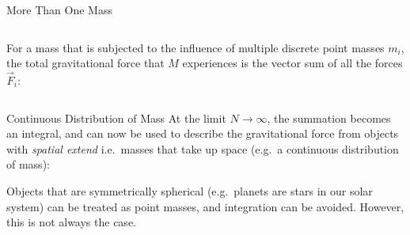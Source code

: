 \documentclass[12pt,compress,aspectratio=169]{beamer}
\begin{document}
\begin{frame}{More Than One Mass}
  \begin{columns}

    For a mass that is subjected to the influence of multiple discrete point
    masses $m_i$, the total gravitational force that $M$ experiences is the
    vector sum of all the forces $\vec F_i$:
    
  \end{columns}
\end{frame}



\begin{frame}{Continuous Distribution of Mass}
  At the limit $N\rightarrow\infty$, the summation becomes an integral, and can
  now be used to describe the gravitational force from objects with
  \emph{spatial extend} i.e.\ masses that take up space (e.g.\ a continuous
  distribution of mass):


  Objects that are symmetrically spherical (e.g.\ planets are stars in our
  solar system) can be treated as point masses, and integration can be avoided.
  However, this is not always the case.
\end{frame}
\end{document}
